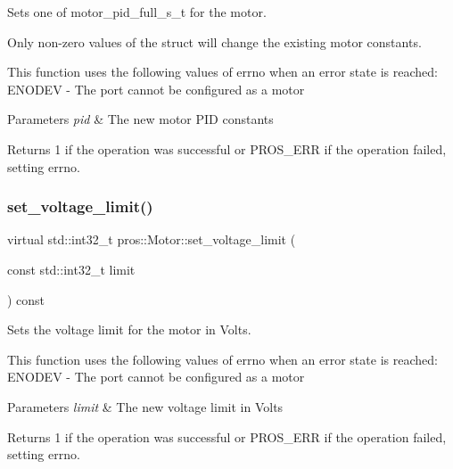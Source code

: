 Sets one of motor\+\_\+pid\+\_\+full\+\_\+s\+\_\+t for the motor. 

Only non-\/zero values of the struct will change the existing motor constants.

This function uses the following values of errno when an error state is reached\+: E\+N\+O\+D\+EV -\/ The port cannot be configured as a motor


\begin{DoxyParams}{Parameters}
{\em pid} & The new motor P\+ID constants\\
\hline
\end{DoxyParams}
\begin{DoxyReturn}{Returns}
1 if the operation was successful or P\+R\+O\+S\+\_\+\+E\+RR if the operation failed, setting errno. 
\end{DoxyReturn}
\mbox{\label{classpros_1_1Motor_a3cd7e4ca0714b533d873796cf8b74a81}} 
\subsubsection{\texorpdfstring{set\+\_\+voltage\+\_\+limit()}{set\_voltage\_limit()}}
{\footnotesize\ttfamily virtual std\+::int32\+\_\+t pros\+::\+Motor\+::set\+\_\+voltage\+\_\+limit (\begin{DoxyParamCaption}\item[{const std\+::int32\+\_\+t}]{limit }\end{DoxyParamCaption}) const\hspace{0.3cm}{\ttfamily [virtual]}}



Sets the voltage limit for the motor in Volts. 

This function uses the following values of errno when an error state is reached\+: E\+N\+O\+D\+EV -\/ The port cannot be configured as a motor


\begin{DoxyParams}{Parameters}
{\em limit} & The new voltage limit in Volts\\
\hline
\end{DoxyParams}
\begin{DoxyReturn}{Returns}
1 if the operation was successful or P\+R\+O\+S\+\_\+\+E\+RR if the operation failed, setting errno. 
\end{DoxyReturn}
\mbox{\label{classpros_1_1Motor_af20c036c1d5d68eb5e762c12f9a4b7fe}} 
